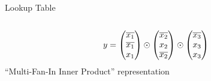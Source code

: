 \documentclass[../250326_cryptlab_flute_security.tex]{subfiles}
\begin{document}
\begin{frame}{Lookup Table}
\begin{columns}
\begin{column}{0.4\textwidth}
            \pause
            \begin{equation*}
                y
                = \begin{pmatrix} \overline{x_1} \\ \overline{x_1} \\ x_1 \end{pmatrix}
                   \odot \begin{pmatrix} \overline{x_2} \\ x_2 \\ \overline{x_2} \end{pmatrix}
                   \odot \begin{pmatrix} \overline{x_3} \\ x_3 \\ x_3 \end{pmatrix}
            \end{equation*}
            ``Multi-Fan-In Inner Product'' representation
        \end{column}
    \end{columns}
\end{frame}

\end{document}
